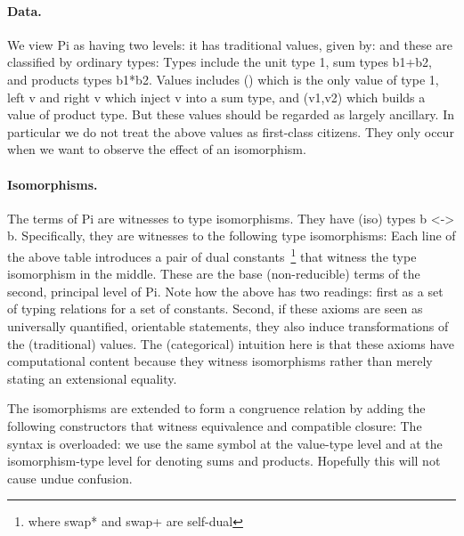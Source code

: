 \documentclass{llncs}
\begin{document}
\paragraph*{Data.}
We view {{Pi}} as having two levels:  it has traditional values, given by:
\noindent and these are classified by ordinary types:
\noindent Types include the unit type {{1}}, sum types {{b1+b2}}, and
products types {{b1*b2}}.  Values includes {{()}} which is the only value of
type {{1}}, {{left v}} and {{right v}} which inject {{v}} into a sum type,
and {{(v1,v2)}} which builds a value of product type. But these values should
be regarded as largely ancillary.  In particular we do not treat the above
values as first-class citizens.  They only occur when we want to observe the
effect of an isomorphism.

\paragraph*{Isomorphisms.} The terms of {{Pi}} are witnesses to type
isomorphisms.  They have (iso) types {{b <-> b}}.  
Specifically, they are witnesses to the following type isomorphisms:
\noindent Each line of the above table introduces a pair of dual
constants~\footnote{where {{swap*}} and {{swap+}} are self-dual} that witness
the type isomorphism in the middle.  These are the base (non-reducible) terms
of the second, principal level of {{Pi}}. Note how the above has two
readings: first as a set of typing relations for a set of constants. Second,
if these axioms are seen as universally quantified, orientable statements,
they also induce transformations of the (traditional) values. The
(categorical) intuition here is that these axioms have computational content
because they witness isomorphisms rather than merely stating an extensional
equality.

The isomorphisms are extended to form a congruence relation by adding the
following constructors that witness equivalence and compatible closure:
%
%
%
\noindent The syntax is overloaded: we use the same symbol at the value-type level
and at the isomorphism-type level for denoting sums and products.  Hopefully
this will not cause undue confusion.
\end{document}
